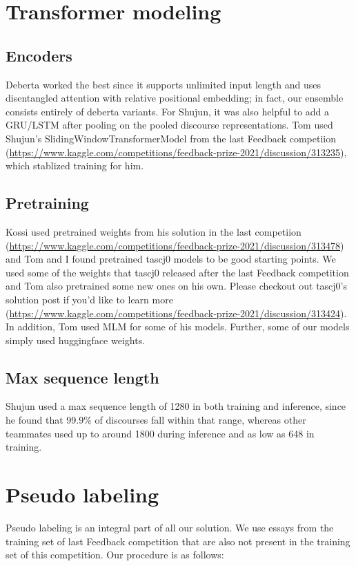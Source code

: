 \documentclass[11pt]{article} %
\begin{document}
\section{Transformer modeling}
\subsection{Encoders}
Deberta  \cite{DBLP:journals/corr/abs-2006-03654, DBLP:journals/corr/abs-2111-09543} worked the best since it supports unlimited input length and uses disentangled attention with relative positional embedding; in fact, our ensemble consists entirely of deberta variants. For Shujun, it was also helpful to add a GRU/LSTM after pooling on the pooled discourse representations. Tom used Shujun's SlidingWindowTransformerModel from the last Feedback competiion (\url{https://www.kaggle.com/competitions/feedback-prize-2021/discussion/313235}), which stablized training for him.

\subsection{Pretraining}
Kossi used pretrained weights from his solution in the last competiion (\url{https://www.kaggle.com/competitions/feedback-prize-2021/discussion/313478}) and Tom and I found pretrained tascj0 models to be good starting points. We used some of the weights that tascj0 released after the last Feedback competition and Tom also pretrained some new ones on his own. Please checkout out tascj0's solution post if you'd like to learn more (\url{https://www.kaggle.com/competitions/feedback-prize-2021/discussion/313424}).
In addition, Tom used MLM for some of his models. Further, some of our models simply used huggingface weights.

\subsection{Max sequence length}
Shujun used a max sequence length of 1280 in both training and inference, since he found that 99.9\% of discourses fall within that range, whereas other teammates used up to around 1800 during inference and as low as 648 in training.

\section{Pseudo labeling}
Pseudo labeling is an integral part of all our solution. We use essays from the training set of last Feedback competition that are also not present in the training set of this competition. Our procedure is as follows:
\end{document}
